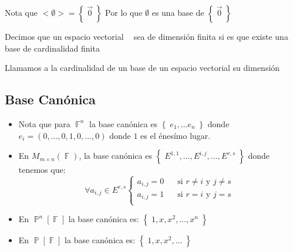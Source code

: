 \documentclass[12pt, fleqn]{report}                             %
\DeclareMathOperator \Space     {\quad}                         %
\theoremstyle{break}                                            %
\DeclareMathOperator \GenericField {\mathbb{F}}                 %
\DeclareMathOperator \VectorSet    {\mathbb{V}}                 %
\DeclareMathOperator \Polynomials  {\mathbb{P}}                 %
\DeclareMathOperator \VectorSpace  {\VectorSet_{\GenericField}} %
\newcommand{\Set}[1]            {\left\{ \; #1 \; \right\}}     %
\begin{document}
                Nota que $<\emptyset> = \Set{\vec 0}$
                Por lo que $\emptyset$ es una base de $\Set{\vec 0}$

                Decimos que un espacio vectorial $\VectorSpace$ sea de dimensión finita si es que existe
                una base de cardinalidad finita

                Llamamos a la cardinalidad de un base de un espacio vectorial su dimensión




            \vspace{1em}
            \subsection{Base Canónica}

                \begin{itemize}
                    
                    \item 
                        Nota que para $\GenericField^n$ la base canónica es $\Set{e_1, \dots e_n}$
                        donde $e_i = (0, \dots, 0,1,0, \dots, 0)$ donde $1$ es el énesímo lugar.

                    \item
                        En $M_{m \times n}(\GenericField)$, la base canónica es 
                        $\Set{E^{1, 1}, \dots, E^{i, j}, \dots, E^{r, s}}$ donde tenemos que:
                        \begin{equation*}
                            \forall a_{i, j} \in E^{r, s}
                            \begin{cases}
                                a_{i, j} = 0 \Space \text{si $r \neq i$ y $j \neq s$}   \\
                                a_{i, j} = 1 \Space \text{si $r=i$ y $j=s$}             \\
                            \end{cases}   
                        \end{equation*}

                    \item
                        En $\Polynomials^n[\GenericField]$ la base canónica es:
                        $\Set{1, x, x^2, \dots, x^n}$

                    \item
                        En $\Polynomials[\GenericField]$ la base canónica es:
                        $\Set{1, x, x^2, \dots}$

                \end{itemize}
\end{document}
